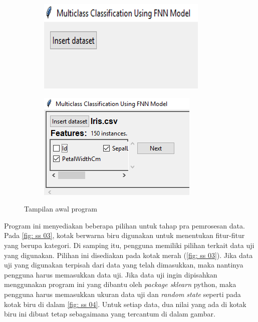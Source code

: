 \begin{figure}[htbp!]
\begin{subfigure}[h]{0.49\textwidth}
  \centering
  \includegraphics[width=\linewidth]{SSprogram/01Awal.png}  
  \caption{}
  \label{fig: ss 01}
\end{subfigure}
\begin{subfigure}[h]{0.49\textwidth}
  \centering
  \includegraphics[width=.7\linewidth]{SSprogram/02-Select-features.png}
  \caption{}
  \label{fig: ss 02}
\end{subfigure}
\caption{Tampilan awal program}
\label{fig: tampilan awal}
\end{figure}

\noindent Program ini menyediakan beberapa pilihan untuk tahap pra pemrosesan data. Pada \ref{fig: ss 03}, kotak berwarna biru digunakan untuk menentukan fitur-fitur yang berupa kategori. Di samping itu, pengguna memiliki pilihan terkait data uji yang digunakan. Pilihan ini disediakan pada kotak merah (\ref{fig: ss 03}). Jika data uji yang digunakan terpisah dari data yang telah dimasukkan, maka nantinya pengguna harus memasukkan data uji. Jika data uji ingin dipisahkan menggunakan program ini yang dibantu oleh \emph{package sklearn} python, maka pengguna harus memasukkan ukuran data uji dan \emph{random state} seperti pada kotak biru di dalam \ref{fig: ss 04}. Untuk setiap data, dua nilai yang ada di kotak biru ini dibuat tetap sebagaimana yang tercantum di dalam gambar.

